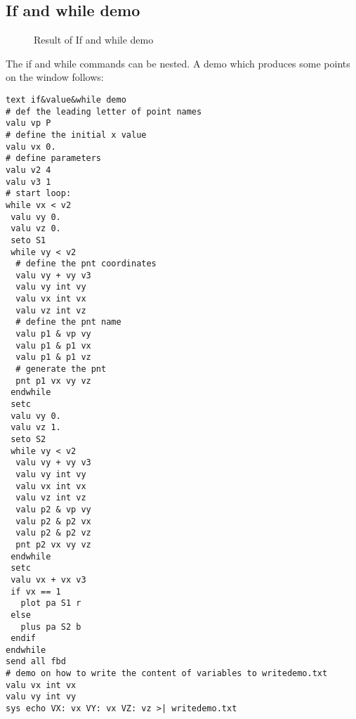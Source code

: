 \documentclass{article}
\begin{document}
\begin{appendix}
\subsection{\label{If and while demo}If and while demo}
\begin{figure}[h]
\caption{\label{Result of If and while demo}Result of If and while demo}
\end{figure}
The if and while commands can be nested. A demo which produces some points on the window follows:
\begin{verbatim}
text if&value&while demo
# def the leading letter of point names
valu vp P
# define the initial x value
valu vx 0.
# define parameters
valu v2 4
valu v3 1
# start loop:
while vx < v2
 valu vy 0.
 valu vz 0.
 seto S1
 while vy < v2
  # define the pnt coordinates
  valu vy + vy v3
  valu vy int vy
  valu vx int vx
  valu vz int vz
  # define the pnt name
  valu p1 & vp vy
  valu p1 & p1 vx
  valu p1 & p1 vz
  # generate the pnt
  pnt p1 vx vy vz
 endwhile
 setc
 valu vy 0.
 valu vz 1.
 seto S2
 while vy < v2
  valu vy + vy v3
  valu vy int vy
  valu vx int vx
  valu vz int vz
  valu p2 & vp vy
  valu p2 & p2 vx
  valu p2 & p2 vz
  pnt p2 vx vy vz
 endwhile
 setc
 valu vx + vx v3
 if vx == 1
   plot pa S1 r
 else
   plus pa S2 b
 endif
endwhile
send all fbd
# demo on how to write the content of variables to writedemo.txt
valu vx int vx
valu vy int vy
sys echo VX: vx VY: vx VZ: vz >| writedemo.txt
\end{verbatim}

\end{appendix}
\end{document}
